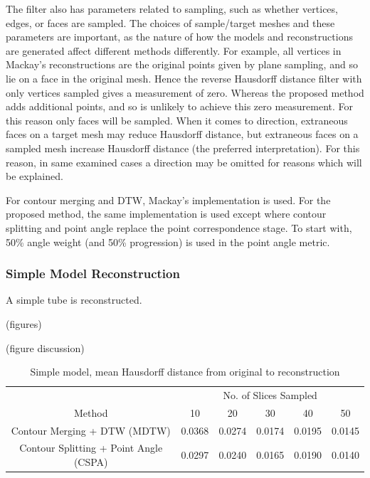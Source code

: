 \documentclass[11p, titlepage]{article}
\begin{document}
The filter also has parameters related to sampling, such as whether vertices, edges, or faces are sampled. The choices of sample/target meshes and these parameters are important, as the nature of how the models and reconstructions are generated affect different methods differently. For example, all vertices in Mackay's reconstructions are the original points given by plane sampling, and so lie on a face in the original mesh. Hence the reverse Hausdorff distance filter with only vertices sampled gives a measurement of zero. Whereas the proposed method adds additional points, and so is unlikely to achieve this zero measurement. For this reason only faces will be sampled. When it comes to direction, extraneous faces on a target mesh may reduce Hausdorff distance, but extraneous faces on a sampled mesh increase Hausdorff distance (the preferred interpretation). For this reason, in same examined cases a direction may be omitted for reasons which will be explained.

For contour merging and DTW, Mackay's implementation is used. For the proposed method, the same implementation is used except where contour splitting and point angle replace the point correspondence stage. To start with, 50\% angle weight (and 50\% progression) is used in the point angle metric.

\subsubsection{Simple Model Reconstruction}

A simple tube is reconstructed.

(figures)

(figure discussion)

\begin{table}[h]
\begin{tabular}{ | c | c | c | c | c | c | }
\hline
& \multicolumn{5}{c|}{No. of Slices Sampled} \\
\cline{2-6}
Method & 10 & 20 & 30 & 40 & 50 \\
\hline
Contour Merging + DTW (MDTW) & 0.0368 & 0.0274 & 0.0174 & 0.0195 & 0.0145 \\
Contour Splitting + Point Angle (CSPA) & 0.0297 & 0.0240 & 0.0165 & 0.0190 & 0.0140 \\
\hline
\end{tabular}
\caption{Simple model, mean Hausdorff distance from original to reconstruction}
\label{table:simple_forward}
\end{table}
\end{document}
